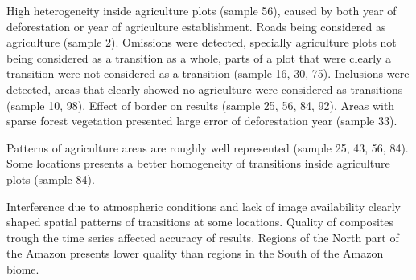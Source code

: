 \documentclass[essd, manuscript]{copernicus}
\begin{document}
High heterogeneity inside agriculture plots (sample 56), caused by both year of deforestation or year of agriculture establishment.
Roads being considered as agriculture (sample 2).
Omissions were detected, specially agriculture plots not being considered as a transition as a whole, parts of a plot that were clearly a transition were not considered as a transition (sample 16, 30, 75).
Inclusions were detected, areas that clearly showed no agriculture were considered as transitions (sample 10, 98).
Effect of border on results (sample 25, 56, 84, 92).
Areas with sparse forest vegetation presented large error of deforestation year (sample 33).

Patterns of agriculture areas are roughly well represented (sample 25, 43, 56, 84).
Some locations presents a better homogeneity of transitions inside agriculture plots (sample 84).

Interference due to atmospheric conditions and lack of image availability clearly shaped spatial patterns of transitions at some locations.
Quality of composites trough the time series affected accuracy of results.
Regions of the North part of the Amazon presents lower quality than regions in the South of the Amazon biome.

\conclusions[Conclusions]
















\end{document}
